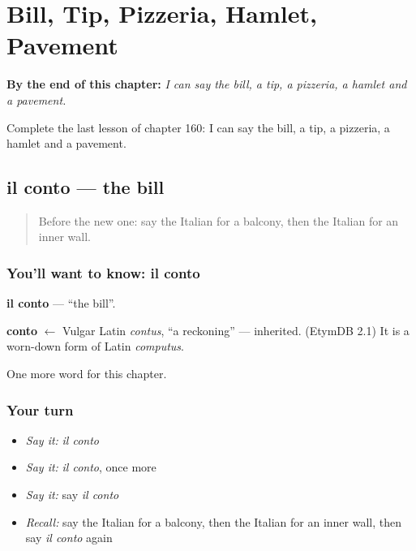
\chapter{Bill, Tip, Pizzeria, Hamlet, Pavement}
\label{ch:it-bill-tip-pizzeria-hamlet-pavement}

\begin{chapteropening}
\textbf{By the end of this chapter:} \emph{I can say the bill, a tip, a pizzeria, a hamlet and a pavement.}

Complete the last lesson of chapter 160: I can say the bill, a tip, a pizzeria, a hamlet and a pavement.
\end{chapteropening}

\section[il conto]{il conto — the bill}

\label{lesson:IT-C160-conto}



\begin{quote}
Before the new one: say the Italian for a balcony, then the Italian for an inner wall.
\end{quote}

\subsection*{You'll want to know: il conto}
\textbf{il conto} — \textquotedblleft{}the bill\textquotedblright{}.

\begin{cousinweb}
\textbf{conto} $\leftarrow$ Vulgar Latin \emph{contus}, \textquotedblleft{}a reckoning\textquotedblright{} — inherited. (EtymDB 2.1) It is a worn-down form of Latin \emph{computus}.
\end{cousinweb}

\begin{grammarlens}[title={What you've built}]
One more word for this chapter.
\end{grammarlens}

\subsection*{Your turn}
\begin{itemize}
\raggedright
  \item \emph{Say it:} \emph{il conto}
  \item \emph{Say it:} \emph{il conto}, once more
  \item \emph{Say it:} say \emph{il conto}
  \item \emph{Recall:} say the Italian for a balcony, then the Italian for an inner wall, then say \emph{il conto} again
\end{itemize}

